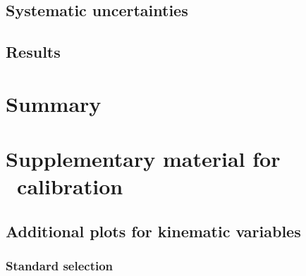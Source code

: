 \documentclass[letterpaper,12pt]{article}
\begin{document}
\subsection{Systematic uncertainties}
\subsection{Results}




\section{Summary}





\newpage
\newpage
\printbibliography


\appendix
\newpage


\section{Supplementary material for \cjet\ calibration}
\subsection{Additional plots for kinematic variables}
\subsubsection{Standard selection}
\end{document}
